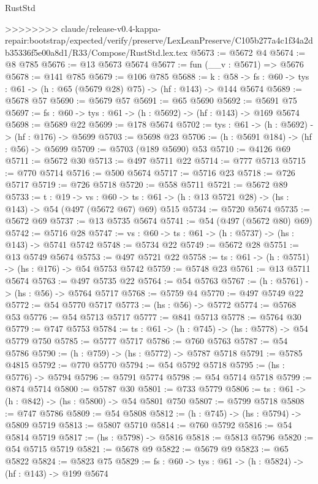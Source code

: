 \begin{lexlean}{RustStd}
\begin{coremodule}
{\begin{coremodule}
{{{{{{{{{{{{>>>>>>>> claude/release-v0.4-kappa-repair:bootstrap/expected/verify/preserve/LexLeanPreserve/C105b277a4c1f34a2db35336f5e00a8d1/R33/Compose/RustStd.lex.tex
@5673 := @5672 @4
@5674 := @8 @785
@5676 := @13 @5673 @5674
@5677 := fun (__v : @5671) => @5676
@5678 := @141 @785
@5679 := @106 @785
@5688 := {k : @58} ->
  {fs : @60} -> {tys : @61} -> (h : @65 (@5679 @28) @75) -> (hf : @143) -> @144 @5674
@5689 := @5678 @57
@5690 := @5679 @57
@5691 := @65 @5690
@5692 := @5691 @75
@5697 := {fs : @60} -> {tys : @61} -> (h : @5692) -> (hf : @143) -> @169 @5674
@5698 := @5689 @22
@5699 := @178 @5674
@5702 := {tys : @61} -> (h : @5692) -> (hf : @176) -> @5699
@5703 := @5698 @23
@5706 := (h : @5691 @184) -> (hf : @56) -> @5699
@5709 := @5703 (@189 @5690) @53
@5710 := @4126 @69
@5711 := @5672 @30
@5713 := @497 @5711 @22
@5714 := @777 @5713
@5715 := @770 @5714
@5716 := @500 @5674
@5717 := @5716 @23
@5718 := @726 @5717
@5719 := @726 @5718
@5720 := @558 @5711
@5721 := @5672 @89
@5733 := {t : @19} ->
  {vs : @60} -> {ts : @61} -> (h : @13 @5721 @28) -> (hs : @143) -> @54 (@497 (@5672 @67) @69) @515
@5734 := @5720 @5674
@5735 := @5672 @69
@5737 := @13 @5735 @5674
@5741 := @54 (@497 (@5672 @80) @69)
@5742 := @5716 @28
@5747 := {vs : @60} -> {ts : @61} -> (h : @5737) -> (hs : @143) -> @5741 @5742
@5748 := @5734 @22
@5749 := @5672 @28
@5751 := @13 @5749 @5674
@5753 := @497 @5721 @22
@5758 := {ts : @61} -> (h : @5751) -> (hs : @176) -> @54 @5753 @5742
@5759 := @5748 @23
@5761 := @13 @5711 @5674
@5763 := @497 @5735 @22
@5764 := @54 @5763
@5767 := (h : @5761) -> (hs : @56) -> @5764 @5717
@5768 := @5759 @4
@5770 := @497 @5749 @22
@5772 := @54 @5770 @5717
@5773 := (hs : @56) -> @5772
@5774 := @5768 @53
@5776 := @54 @5713 @5717
@5777 := @841 @5713
@5778 := @5764 @30
@5779 := @747 @5753
@5784 := {ts : @61} -> (h : @745) -> (hs : @5778) -> @54 @5779 @750
@5785 := @5777 @5717
@5786 := @760 @5763
@5787 := @54 @5786
@5790 := (h : @759) -> (hs : @5772) -> @5787 @5718
@5791 := @5785 @4815
@5792 := @770 @5770
@5794 := @54 @5792 @5718
@5795 := (hs : @5776) -> @5794
@5796 := @5791 @5774
@5798 := @54 @5714 @5718
@5799 := @874 @5714
@5800 := @5787 @30
@5801 := @733 @5779
@5806 := {ts : @61} -> (h : @842) -> (hs : @5800) -> @54 @5801 @750
@5807 := @5799 @5718
@5808 := @747 @5786
@5809 := @54 @5808
@5812 := (h : @745) -> (hs : @5794) -> @5809 @5719
@5813 := @5807 @5710
@5814 := @760 @5792
@5816 := @54 @5814 @5719
@5817 := (hs : @5798) -> @5816
@5818 := @5813 @5796
@5820 := @54 @5715 @5719
@5821 := @5678 @9
@5822 := @5679 @9
@5823 := @65 @5822
@5824 := @5823 @75
@5829 := {fs : @60} -> {tys : @61} -> (h : @5824) -> (hf : @143) -> @199 @5674
}}}}}}}}}}}}
\end{coremodule}}
\end{coremodule}
\end{lexlean}

